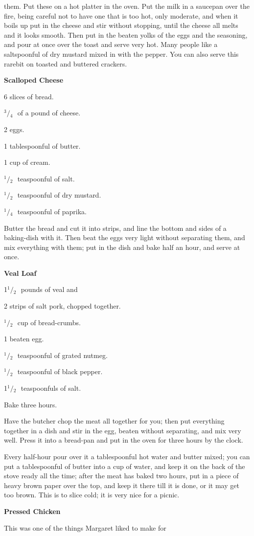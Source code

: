 \documentclass[11pt]{book}
\newcommand{\indpar}{\par\noindent\hspace*{\parindent}}
\newcommand{\ingredient}{\indpar}
\newcommand{\instruction}{\indpar}
\newcommand{\OneHalf}{\ensuremath{{}^1\!\!/\!{}_2\mbox{\ }}}
\newcommand{\OneQuarter}{\ensuremath{{}^1\!\!/\!{}_4\mbox{\ }}}
\newcommand{\ThreeQuarters}{\ensuremath{{}^3\!\!/\!{}_4\mbox{\ }}}
\newenvironment{RecipeTitle}{\medskip\begin{center}\large\bf }{\end{center}\smallskip}
\begin{document}
them.  Put these on a hot platter in the oven.  Put the
milk in a saucepan over the fire, being careful not to
have one that is too hot, only moderate, and when it
boils up put in the cheese and stir without stopping,
until the cheese all melts and it looks smooth.  Then put
in the beaten yolks of the eggs and the seasoning, and
pour at once over the toast and serve very hot.  Many
people like a saltspoonful of dry mustard mixed in with
the pepper.  You can also serve this rarebit on toasted
and buttered crackers.
\begin{RecipeTitle}
Scalloped Cheese\label{scalloped_cheese}
\end{RecipeTitle}
\ingredient  6 slices of bread.
\ingredient  \ThreeQuarters of a pound of cheese.
\ingredient  2 eggs.
\ingredient  1 tablespoonful of butter.
\ingredient  1 cup of cream.
\ingredient  \OneHalf teaspoonful of salt.
\ingredient  \OneHalf teaspoonful of dry mustard.
\ingredient  \OneQuarter teaspoonful of paprika.
\instruction
  Butter the bread and cut it into strips, and line the
bottom and sides of a baking-dish with it.  Then beat the
eggs very light without separating them, and mix everything
with them; put in the dish and bake half an hour, and
serve at once.
\begin{RecipeTitle}
Veal Loaf\label{veal_loaf}
\end{RecipeTitle}
\ingredient  1\OneHalf pounds of veal and
\ingredient  2 strips of salt pork, chopped together.
\ingredient  \OneHalf cup of bread-crumbs.
\ingredient  1 beaten egg.
\ingredient  \OneHalf teaspoonful of grated nutmeg.
\ingredient  \OneHalf teaspoonful of black pepper.
\ingredient  1\OneHalf teaspoonfuls of salt.
\instruction
  Bake three hours.
\instruction
  Have the butcher chop the meat all together for you;
then put everything together in a dish and stir in the egg,
beaten without separating, and mix very well.  Press it
into a bread-pan and put in the oven for three hours by
the clock.
\instruction
  Every half-hour pour over it a tablespoonful hot water
and butter mixed; you can put a tablespoonful of butter
into a cup of water, and keep it on the back of the stove
ready all the time; after the meat has baked two hours,
put in a piece of heavy brown paper over the top, and
keep it there till it is done, or it may get too brown.
This is to slice cold; it is very nice for a picnic.
\begin{RecipeTitle}
Pressed Chicken\label{pressed_chicken}
\end{RecipeTitle}
\instruction
  This was one of the things Margaret liked to make for
\end{document}
